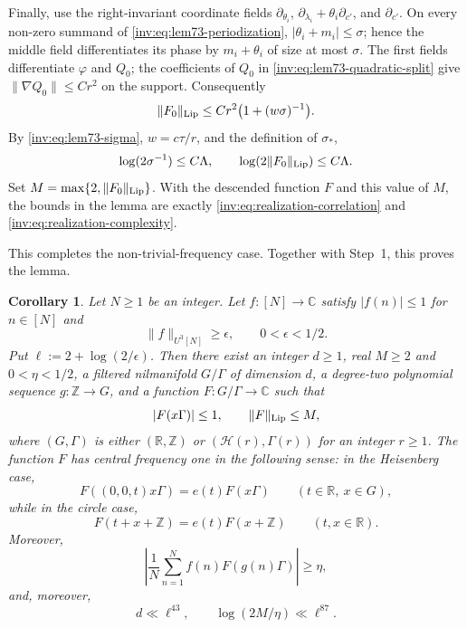 \documentclass[twoside]{aomart}
\makeatletter
\theoremstyle{paperplain}
\newtheorem{corollary}[theorem]{Corollary}
\theoremstyle{paperdefinition}
\renewenvironment{proof}[1][\proofname]{\par\pushQED{\qed}%
  \normalfont\topsep6\p@\@plus3\p@\relax\trivlist
  \item[\hskip\labelsep\itshape #1\@addpunct{.}]\ignorespaces
}{\popQED\endtrivlist\@endpefalse}
\numberwithin{equation}{section}
\makeatother
\begin{document}
\begin{proof}
Finally, use the right-invariant coordinate fields
$\partial_{\theta_i}$,
$\partial_{\lambda_i}+\theta_i\partial_{c'}$, and $\partial_{c'}$.
On every non-zero summand of \eqref{inv:eq:lem73-periodization}, $|\theta_i+m_i|\le\sigma$; hence the
middle field differentiates its phase by $m_i+\theta_i$ of size at most
$\sigma$.  The first fields differentiate $\varphi$ and $Q_0$; the
coefficients of $Q_0$ in \eqref{inv:eq:lem73-quadratic-split} give $\|\nabla Q_0\|\le Cr^2$ on the support.
Consequently
\begin{equation*}
 \|F_0\|_{\rm Lip}\le Cr^2\bigl(1+(w\sigma)^{-1}\bigr).            
\end{equation*}
By \eqref{inv:eq:lem73-sigma}, $w=c\tau/r$, and the definition of $\sigma_*$,
\begin{equation*}
 \log(2\sigma^{-1})\le C\Lambda,\qquad
 \log(2\|F_0\|_{\rm Lip})\le C\Lambda.                            
\end{equation*}
Set $M=\max\{2,\|F_0\|_{\rm Lip}\}$.  With the descended function
$F$ and this value of $M$, the bounds in the lemma are exactly
\eqref{inv:eq:realization-correlation} and \eqref{inv:eq:realization-complexity}.

This completes the non-trivial-frequency case.  Together with Step~1,
this proves the lemma.
\end{proof}

\begin{corollary}
\label{inv:initial-inverse}
Let $N\ge 1$ be an integer.  Let
$f:[N]\to\mathbb C$ satisfy $|f(n)|\le1$ for $n\in[N]$ and
\[
 \|f\|_{U^3[N]}\ge\epsilon,
 \qquad 0<\epsilon<1/2.
\]
Put $\ell:=2+\log(2/\epsilon)$.  Then there exist an integer
$d\ge1$, real $M\ge2$ and $0<\eta<1/2$, a filtered nilmanifold
$G/\Gamma$ of dimension $d$, a degree-two polynomial sequence
$g:\mathbb Z\to G$, and a function $F:G/\Gamma\to\mathbb C$ such that
\[
 |F(x\Gamma)|\le1,\qquad \|F\|_{\rm Lip}\le M,
\]
where $(G,\Gamma)$ is either $(\mathbb R,\mathbb Z)$ or
$(\mathcal H(r),\Gamma(r))$ for an integer $r\ge1$.  The function $F$ has
central frequency one in the following sense: in the Heisenberg
case,
\[
 F((0,0,t)x\Gamma)=e(t)F(x\Gamma)
 \qquad(t\in\mathbb R,\ x\in G),
\]
while in the circle case,
\[
 F(t+x+\mathbb Z)=e(t)F(x+\mathbb Z)
 \qquad(t,x\in\mathbb R).
\]
Moreover,
\begin{equation*}
 \left|\frac1N\sum_{n=1}^N f(n)F(g(n)\Gamma)\right|\ge\eta,
\end{equation*}
and, moreover,
\begin{equation*}
 d\ll\ell^{43},
 \qquad \log(2M/\eta)\ll\ell^{87}.
\end{equation*}
\end{corollary}
\end{document}
